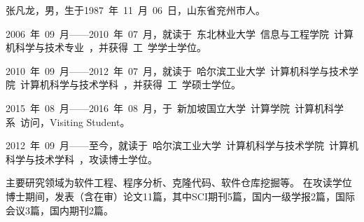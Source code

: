 


张凡龙，男，生于1987~年~11~月~06~日，山东省兖州市人。

2006~年~09~月------2010~年~07~月，就读于~东北林业大学~信息与工程学院~计算机科学与技术专业~，并获得~工~学学士学位。

2010~年~09~月------2012~年~07~月，就读于~哈尔滨工业大学~计算机科学与技术学院~计算机科学与技术学科~，并获得~工~学硕士学位。

2015~年~08~月------2016~年~08~月，于~新加坡国立大学~计算学院~计算机科学系~访问，Visiting Student。

2012~年~09~月------至今，就读于~哈尔滨工业大学~计算机科学与技术学院~计算机科学与技术学科~，攻读博士学位。



主要研究领域为软件工程、程序分析、克隆代码、软件仓库挖掘等。
在攻读学位博士期间，发表（含在审）论文11篇，其中SCI期刊5篇，国内一级学报2篇，国际会议3篇，国内期刊2篇。%

\vspace{3em}\noindent
